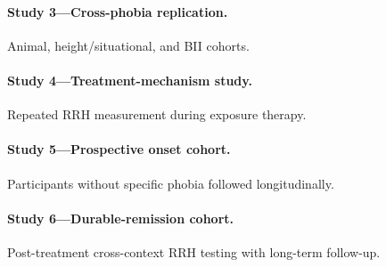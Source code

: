 \documentclass[11pt]{article}
\begin{document}
\paragraph{Study 3---Cross-phobia replication.} Animal, height/situational, and BII cohorts.

\paragraph{Study 4---Treatment-mechanism study.} Repeated RRH measurement during exposure therapy.

\paragraph{Study 5---Prospective onset cohort.} Participants without specific phobia followed longitudinally.

\paragraph{Study 6---Durable-remission cohort.} Post-treatment cross-context RRH testing with long-term follow-up.
\end{document}
